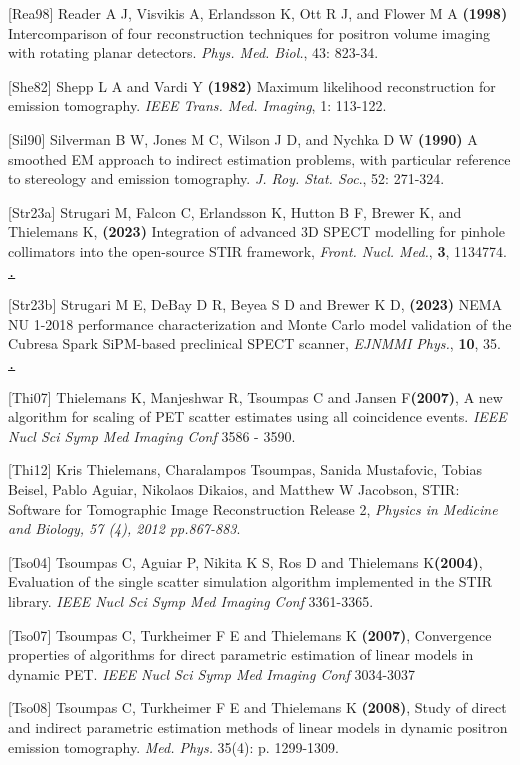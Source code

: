 \documentclass{article}
\def\url#1#2{\mbox{\href{#1}{\tt #2}}}
\begin{document}
{{{{{{ {[}Rea98] Reader A J, Visvikis A, Erlandsson K, Ott R J, and Flower 
M A \textbf{(1998)} Intercomparison of four reconstruction techniques 
for positron volume imaging with rotating planar detectors. \textit{Phys. 
Med. Biol.}, 43: 823-34.

{[}She82] Shepp L A and Vardi Y \textbf{(1982)} Maximum likelihood reconstruction 
for emission tomography. \textit{IEEE Trans. Med. Imaging}, 1: 113-122.

{[}Sil90] Silverman B W, Jones M C, Wilson J D, and Nychka D W \textbf{(1990)} 
A smoothed EM approach to indirect estimation problems, with 
particular reference to stereology and emission tomography. \textit{J. 
Roy. Stat. Soc}., 52: 271-324. 

[Str23a] Strugari M, Falcon C, Erlandsson K, Hutton B F, Brewer K, and Thielemans K, \textbf{(2023)} Integration of advanced 3D SPECT modelling for pinhole collimators into the open-source STIR framework, \textit{Front. Nucl. Med.}, \textbf{3}, 1134774. \url{https://doi.org/10.3389/fnume.2023.1134774}.

[Str23b] Strugari M E, DeBay D R, Beyea S D and Brewer K D, \textbf{(2023)} NEMA NU 1-2018 performance characterization and Monte Carlo model validation of the Cubresa Spark SiPM-based preclinical SPECT scanner, \textit{EJNMMI Phys.}, \textbf{10}, 35. \url{https://doi.org/10.1186/s40658-023-00555-6}.

{[}Thi07{]} Thielemans K, Manjeshwar R, Tsoumpas C and Jansen F\textbf{(2007)}, 
A new algorithm for scaling of PET scatter estimates using all coincidence events. 
\textit { IEEE Nucl Sci Symp Med Imaging Conf } 3586 - 3590.

{[}Thi12] Kris Thielemans, Charalampos Tsoumpas, Sanida Mustafovic, Tobias Beisel, Pablo Aguiar, Nikolaos Dikaios, and Matthew W Jacobson,
STIR: Software for Tomographic Image Reconstruction Release 2,
\textit{Physics in Medicine and Biology, 57 (4), 2012 pp.867-883}.

{[}Tso04{]} Tsoumpas C, Aguiar P, Nikita K S, Ros D and Thielemans K\textbf{(2004)}, 
Evaluation of the single scatter simulation algorithm implemented in the STIR library. 
\textit { IEEE Nucl Sci Symp Med Imaging Conf } 3361-3365.

{[}Tso07{]} Tsoumpas C, Turkheimer F E and Thielemans K  \textbf{(2007)}, 
Convergence properties of algorithms for direct parametric estimation of linear models in dynamic PET. 
\textit{IEEE Nucl Sci Symp Med Imaging Conf} 3034-3037

{[}Tso08{]} Tsoumpas C, Turkheimer F E and Thielemans K \textbf{(2008)}, Study of direct and indirect 
parametric estimation methods of linear models in dynamic positron emission tomography. \textit{Med. Phys.} 
35(4): p. 1299-1309.

}}}}}}
\end{document}
